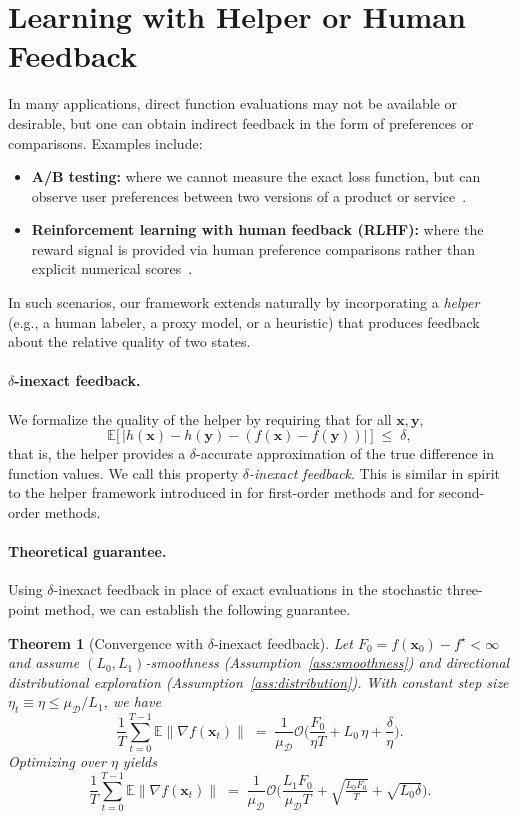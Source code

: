 \documentclass[twoside]{article}
\theoremstyle{plain}
\newtheorem{theorem}[lemma]{Theorem}
\theoremstyle{definition}
\theoremstyle{remark}
\def\cO{{\mathcal{O}}}
\def\vx{{\bm{x}}}
\def\vy{{\bm{y}}}
\newcommand{\E}{\mathbb{E}}
\begin{document}
\section{Learning with Helper or Human Feedback}\label{sec:helper}

In many applications, direct function evaluations may not be available or
desirable, but one can obtain indirect feedback in the form of preferences or
comparisons. Examples include:
\begin{itemize}
    \item \textbf{A/B testing:} where we cannot measure the exact loss function,
    but can observe user preferences between two versions of a product or
    service~\cite{kohavi2009controlled}.
    \item \textbf{Reinforcement learning with human feedback (RLHF):} where the
    reward signal is provided via human preference comparisons rather than
    explicit numerical scores~\cite{christiano2017deep, ouyang2022training}.
\end{itemize}
In such scenarios, our framework extends naturally by incorporating a
\emph{helper} (e.g., a human labeler, a proxy model, or a heuristic) that
produces feedback about the relative quality of two states.

\paragraph{$\delta$-inexact feedback.}
We formalize the quality of the helper by requiring that for all $\vx,\vy$,
\[
    \E\big[\,\big|h(\vx) - h(\vy) - (f(\vx) - f(\vy))\big|\,\big]
    \;\leq\; \delta,
\]
that is, the helper provides a $\delta$-accurate approximation of the true
difference in function values. We call this property
\emph{$\delta$-inexact feedback}. This is similar in spirit to the helper framework introduced in \cite{chayti2024optimization} for first-order methods and \cite{chayti2024unified} for second-order methods.

\paragraph{Theoretical guarantee.}
Using $\delta$-inexact feedback in place of exact evaluations in the
stochastic three-point method, we can establish the following guarantee.

\begin{theorem}[Convergence with $\delta$-inexact feedback]
\label{thm:helper}
Let $F_0=f(\vx_0)-f^\star<\infty$ and assume
$(L_0,L_1)$-smoothness (Assumption~\ref{ass:smoothness}) and
directional distributional exploration
(Assumption~\ref{ass:distribution}). With constant step size
$\eta_t\equiv \eta \le \mu_{\mathcal{D}}/L_1$, we have
\[
    \frac{1}{T}\sum_{t=0}^{T-1}\E\|\nabla f(\vx_t)\|
    \;=\;\frac{1}{\mu_{\mathcal{D}}}
    \cO\!\Big(
        \frac{F_0}{\eta T}
        + L_0\,\eta
        + \frac{\delta}{\eta}
    \Big).
\]
Optimizing over $\eta$ yields
\[
    \frac{1}{T}\sum_{t=0}^{T-1}\E\|\nabla f(\vx_t)\|
    \;=\;\frac{1}{\mu_{\mathcal{D}}}
    \cO\!\Big(
        \frac{L_1 F_0}{\mu_{\mathcal{D}} T}
        + \sqrt{\tfrac{L_0 F_0}{T}}
        + \sqrt{L_0\delta}
    \Big).
\]
\end{theorem}
\end{document}
